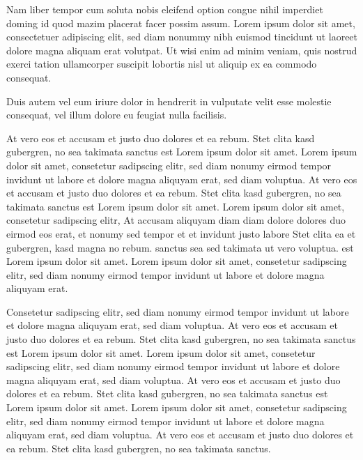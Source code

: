 \documentclass[]{../metanetpaper}
\begin{document}
\begin{Parallel}[c]{80mm}{80mm}
{    Nam liber tempor cum soluta nobis eleifend option congue nihil imperdiet doming id quod mazim placerat facer possim assum. Lorem ipsum dolor sit amet, consectetuer adipiscing elit, sed diam nonummy nibh euismod tincidunt ut laoreet dolore magna aliquam erat volutpat. Ut wisi enim ad minim veniam, quis nostrud exerci tation ullamcorper suscipit lobortis nisl ut aliquip ex ea commodo consequat.   

    Duis autem vel eum iriure dolor in hendrerit in vulputate velit esse molestie consequat, vel illum dolore eu feugiat nulla facilisis.   

    At vero eos et accusam et justo duo dolores et ea rebum. Stet clita kasd gubergren, no sea takimata sanctus est Lorem ipsum dolor sit amet. Lorem ipsum dolor sit amet, consetetur sadipscing elitr, sed diam nonumy eirmod tempor invidunt ut labore et dolore magna aliquyam erat, sed diam voluptua. At vero eos et accusam et justo duo dolores et ea rebum. Stet clita kasd gubergren, no sea takimata sanctus est Lorem ipsum dolor sit amet. Lorem ipsum dolor sit amet, consetetur sadipscing elitr, At accusam aliquyam diam diam dolore dolores duo eirmod eos erat, et nonumy sed tempor et et invidunt justo labore Stet clita ea et gubergren, kasd magna no rebum. sanctus sea sed takimata ut vero voluptua. est Lorem ipsum dolor sit amet. Lorem ipsum dolor sit amet, consetetur sadipscing elitr, sed diam nonumy eirmod tempor invidunt ut labore et dolore magna aliquyam erat.   

    Consetetur sadipscing elitr, sed diam nonumy eirmod tempor invidunt ut labore et dolore magna aliquyam erat, sed diam voluptua. At vero eos et accusam et justo duo dolores et ea rebum. Stet clita kasd gubergren, no sea takimata sanctus est Lorem ipsum dolor sit amet. Lorem ipsum dolor sit amet, consetetur sadipscing elitr, sed diam nonumy eirmod tempor invidunt ut labore et dolore magna aliquyam erat, sed diam voluptua. At vero eos et accusam et justo duo dolores et ea rebum. Stet clita kasd gubergren, no sea takimata sanctus est Lorem ipsum dolor sit amet. Lorem ipsum dolor sit amet, consetetur sadipscing elitr, sed diam nonumy eirmod tempor invidunt ut labore et dolore magna aliquyam erat, sed diam voluptua. At vero eos et accusam et justo duo dolores et ea rebum. Stet clita kasd gubergren, no sea takimata sanctus.   

}
\end{Parallel}
\end{document}
